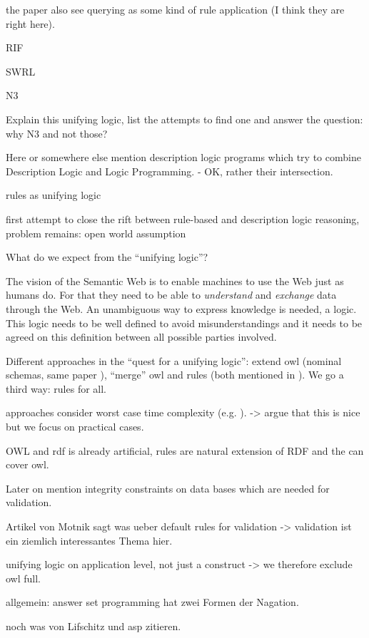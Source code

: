 the paper also see querying as some kind of rule application (I think they are right here).


RIF

SWRL

N3

\cite{N3Logic}

Explain this unifying logic, list the attempts to find one and answer the question: why N3 and not those?



Here or somewhere else mention description logic programs \cite{DLP} which try to combine Description Logic and Logic Programming. - OK, rather their intersection.

\cite{knorr} rules as unifying logic

\cite{unilogic} first attempt to close the rift between rule-based and description logic reasoning, problem remains: open world assumption


What do we expect from the ``unifying logic''?

The vision of the Semantic Web is to enable machines to use the Web just as humans do. For that they need to be able to \emph{understand} and \emph{exchange} data through the Web. 
An unambiguous way to express knowledge is needed, a logic. 
This logic needs to be well defined to avoid misunderstandings and it needs to be agreed on this definition between all possible parties involved.


Different approaches in the ``quest for a unifying logic'': extend owl (nominal schemas, same paper \cite{unilogic}), ``merge'' owl and rules (both mentioned in \cite{unilogic}). We go a third way: rules for all.

approaches consider worst case time complexity (e.g. \cite{unilogic}). -> argue that this is nice but we focus on practical cases.

OWL and rdf is already artificial, rules are natural extension of RDF and the can cover owl.

Later on mention integrity constraints on data bases which are needed for validation.

Artikel von Motnik \cite{DLASP} sagt was ueber default rules for validation -> validation ist ein ziemlich interessantes Thema hier.

unifying logic on application level, not just a construct -> we therefore exclude owl full.

allgemein: answer set programming hat zwei Formen der Nagation.

noch was von Lifschitz und asp zitieren.


